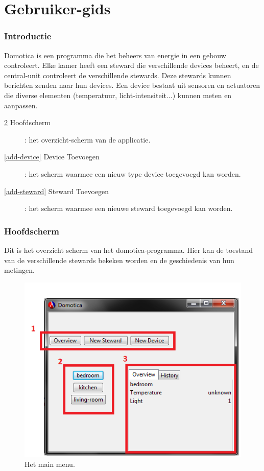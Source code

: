 \documentclass{article}
\begin{document}
	\part*{Gebruiker-gids}
	
	\section{Introductie}
	Domotica is een programma die het beheers van energie in een gebouw controleert. Elke kamer heeft een steward die verschillende devices beheert, en de central-unit controleert de verschillende stewards. Deze stewards kunnen berichten zenden naar hun devices. Een device bestaat uit sensoren en actuatoren die diverse elementen (temperatuur, licht-intensiteit...) kunnen meten en aanpassen.
	
	\begin{description}
		\item[\ref{main-menu} Hoofdscherm] : het overzicht-scherm van de applicatie.
		\item[\ref{add-device} Device Toevoegen] : het scherm waarmee een nieuw type device toegevoegd kan worden.
		\item[\ref{add-steward} Steward Toevoegen] : het scherm waarmee een nieuwe steward toegevoegd kan worden.
	\end{description}
	
	\section{Hoofdscherm}
	\label{main-menu}
	Dit is het overzicht scherm van het domotica-programma. Hier kan de toestand van de verschillende stewards bekeken worden en de geschiedenis van hun metingen.
	
	\newpage
	
	\begin{figure}
		\begin{center}
			\includegraphics{screenshot/main-menu.png}
		\end{center}
		\caption{Het main menu.}
	\end{figure}
	
\end{document}
